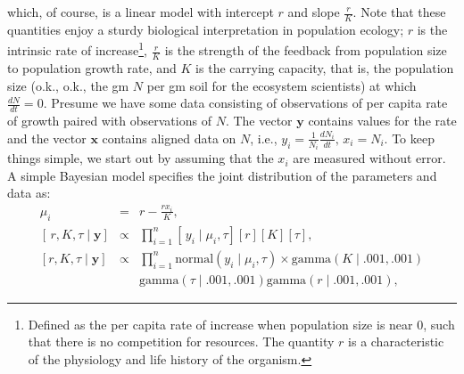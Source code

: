 \documentclass[12pt,english]{article}
\begin{document}
\noindent which, of course, is a linear model with intercept $r$ and slope $\frac{r}{K}$. Note that these quantities enjoy a sturdy biological interpretation in population ecology; $r$ is the intrinsic rate of increase\footnote{Defined as the per capita rate of increase when population size is near 0, such that there is no competition for resources. The quantity $r$ is a characteristic of the physiology and life history of the organism.}, $\frac{r}{K}$ is the strength of the feedback from population size to population growth rate, and $K$ is the carrying capacity, that is, the population size (o.k., o.k., the gm $N$ per gm soil for the ecosystem scientists) at which $\frac{}{}$$\frac{dN}{dt}=0$. Presume we have some data consisting of observations of per capita rate of growth paired with observations of $N$. The vector $\mathbf{y}$ contains values for the rate and the vector $\mathbf{x}$ contains aligned data on $N$, i.e., $y_{i}=\frac{1}{N_{i}}\frac{dN_{i}}{dt},\, x_{i}=N_{i}$. To keep things simple, we start out by assuming that the $x_{i}$ are measured without error. A simple Bayesian model specifies the joint distribution of the parameters and data as: 
\vspace{-.6 cm}
\begin{eqnarray}
\mu_{i} & = & r-\frac{rx_{i}}{K}\textrm{,}\\
\left[\,r,K,\tau\mid\mathbf{y}\right] & \propto & \prod_{i=1}^{n}\left[\,y_{i}\mid\mu_{i},\tau\right]\left[r\right]\left[K\right]\left[\tau\right]\textrm{,}\\
\left[r,K,\tau\mid\mathbf{y}\right] & \propto & \prod_{i=1}^{n}\textrm{normal}\left(y_{i}\mid\mu_{i},\tau\right)\times\label{eq:conditional} \textrm{gamma}\left(K\mid.001,.001\right)\label{eq:notation_used}\\
 &  &\textrm{gamma}\left(\tau\mid.001,.001\right)\textrm{gamma}\left(r\mid.001,.001\right),\nonumber 
\end{eqnarray}
\end{document}
